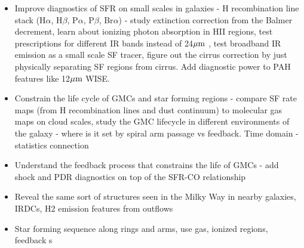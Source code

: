 \documentclass[12pt]{article}
\begin{document}
\begin{itemize}
   
    \item{Improve diagnostics of SFR on small scales in galaxies - H recombination line stack (H$\alpha$, H$\beta$, P$\alpha$, P$\beta$, Br$\alpha$) - study extinction correction from the Balmer decrement, learn about ionizing photon absorption in HII regions, test prescriptions for different IR bands instead of 24$\hbox{$\mu$m}$ , test broadband IR emission as a small scale SF tracer, figure out the cirrus correction by just physically separating SF regions from cirrus. Add diagnostic power to PAH features like 12$\hbox{$\mu$m}$ WISE.}\vspace{-0.1in}
    
    \item{Constrain the life cycle of GMCs and star forming regions - compare SF rate maps (from H recombination lines and dust continuum) to molecular gas maps on cloud scales, study the GMC lifecycle in different environments of the galaxy - where is it set by spiral arm passage vs feedback. Time domain - statistics connection}\vspace{-0.1in}
    
    \item{Understand the feedback process that constrains the life of GMCs - add shock and PDR diagnostics on top of the SFR-CO relationship}\vspace{-0.1in}
    
    \item{Reveal the same sort of structures seen in the Milky Way in nearby galaxies, IRDCs, H2 emission features from outflows}\vspace{-0.1in}
    
    \item{Star forming sequence along rings and arms, use gas, ionized regions, feedback s}

\end{itemize}
\end{document}
